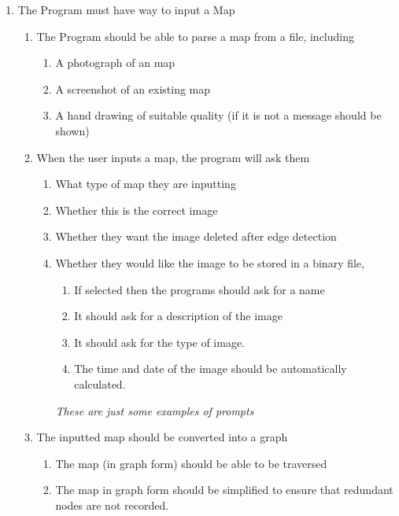 \begin{flushleft}
        \begin{enumerate}
            \item The Program must have way to input a Map
            \begin{enumerate}
                \item The Program should be able to parse a map from a file, including
                \begin{enumerate}
                    \item A photograph of an map
                    \item A screenshot of an existing map
                    \item A hand drawing of suitable quality (if it is not a message should be shown)
                \end{enumerate}
                \item When the user inputs a map, the program will ask them
                \begin{enumerate}
                    \item What type of map they are inputting
                    \item Whether this is the correct image
                    \item Whether they want the image deleted after edge detection
                    \item Whether they would like the image to be stored in a binary file, \\
                    \begin{enumerate}
                        \item If selected then the programs should ask for a name
                        \item It should ask for a description of the image
                        \item It should ask for the type of image.
                        \item The time and date of the image should be automatically calculated.
                    \end{enumerate}
                    \emph{These are just some examples of prompts}
                \end{enumerate}
                \item The inputted map should be converted into a graph
                \begin{enumerate}
                    \item The map (in graph form) should be able to be traversed
                    \item The map in graph form should be simplified to ensure that redundant nodes are not recorded.
                \end{enumerate}
                

\end{enumerate}
\end{enumerate}
\end{flushleft}
